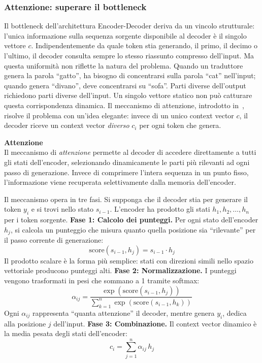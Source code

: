 \subsubsection{Attenzione: superare il bottleneck}
\label{subsubsec:attention}
Il bottleneck dell'architettura Encoder-Decoder deriva da un vincolo strutturale: l'unica informazione sulla sequenza sorgente disponibile al decoder è il singolo vettore $c$. Indipendentemente da quale token stia generando, il primo, il decimo o l'ultimo, il decoder consulta sempre lo stesso riassunto compresso dell'input.
Ma questa uniformità non riflette la natura del problema. Quando un traduttore genera la parola ``gatto'', ha bisogno di concentrarsi sulla parola ``cat'' nell'input; quando genera ``divano'', deve concentrarsi su ``sofa''. Parti diverse dell'output richiedono parti diverse dell'input. Un singolo vettore statico non può catturare questa corrispondenza dinamica.
Il meccanismo di attenzione, introdotto in~\parencite{bahdanau2014neural}, risolve il problema con un'idea elegante: invece di un unico context vector $c$, il decoder riceve un context vector \textit{diverso} $c_i$ per ogni token che genera.
\begin{notebox}
\textbf{Attenzione}\\
Il meccanismo di \textit{attenzione} permette al decoder di accedere direttamente a tutti gli stati dell'encoder, selezionando dinamicamente le parti più rilevanti ad ogni passo di generazione. Invece di comprimere l'intera sequenza in un punto fisso, l'informazione viene recuperata selettivamente dalla memoria dell'encoder.
\end{notebox}
Il meccanismo opera in tre fasi. Si supponga che il decoder stia per generare il token $y_i$ e si trovi nello stato $s_{i-1}$. L'encoder ha prodotto gli stati $h_1, h_2, \dots, h_n$ per i token sorgente.
\textbf{Fase 1: Calcolo dei punteggi.} Per ogni stato dell'encoder $h_j$, si calcola un punteggio che misura quanto quella posizione sia ``rilevante'' per il passo corrente di generazione:
\begin{equation}
\text{score}(s_{i-1}, h_j) = s_{i-1} \cdot h_j
\end{equation}
Il prodotto scalare è la forma più semplice: stati con direzioni simili nello spazio vettoriale producono punteggi alti.
\textbf{Fase 2: Normalizzazione.} I punteggi vengono trasformati in pesi che sommano a 1 tramite softmax:
\begin{equation}
\alpha_{ij} = \frac{\exp(\text{score}(s_{i-1}, h_j))}{\sum_{k=1}^{n} \exp(\text{score}(s_{i-1}, h_k))}
\end{equation}
Ogni $\alpha_{ij}$ rappresenta ``quanta attenzione'' il decoder, mentre genera $y_i$, dedica alla posizione $j$ dell'input.
\textbf{Fase 3: Combinazione.} Il context vector dinamico è la media pesata degli stati dell'encoder:
\begin{equation}
c_i = \sum_{j=1}^{n} \alpha_{ij} \, h_j
\end{equation}

